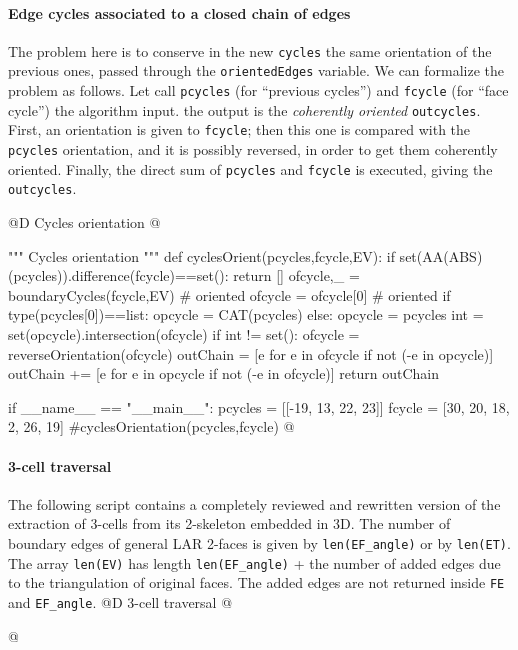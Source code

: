 \documentclass[11pt,oneside]{article}    %
\begin{document}
\paragraph{Edge cycles associated to a closed chain of edges}

The problem here is to conserve in the new \texttt{cycles} the same orientation of the previous ones,
passed through the \texttt{orientedEdges} variable. We can formalize the problem as follows. Let call \texttt{pcycles} (for ``previous cycles'') and \texttt{fcycle} (for ``face cycle'') the algorithm input. the output is the \emph{coherently oriented} \texttt{outcycles}. First, an orientation is given to \texttt{fcycle}; then this one is compared with the \texttt{pcycles} orientation, and it is possibly reversed, in order to get them coherently oriented. Finally, the direct sum of \texttt{pcycles} and \texttt{fcycle} is executed, giving the \texttt{outcycles}.

@D Cycles orientation
@{""" Cycles orientation """
def cyclesOrient(pcycles,fcycle,EV):
    if set(AA(ABS)(pcycles)).difference(fcycle)==set(): return []
    ofcycle,_ = boundaryCycles(fcycle,EV) # oriented 
    ofcycle = ofcycle[0] # oriented 
    if type(pcycles[0])==list: opcycle = CAT(pcycles)
    else: opcycle = pcycles
    int = set(opcycle).intersection(ofcycle)
    if int != set(): 
        ofcycle = reverseOrientation(ofcycle)
    outChain = [e for e in ofcycle if not (-e in opcycle)] 
    outChain += [e for e in opcycle if not (-e in ofcycle)] 
    return outChain

if __name__ == "__main__":
    pcycles = [[-19, 13, 22, 23]]
    fcycle = [30, 20, 18, 2, 26, 19]
    #cyclesOrientation(pcycles,fcycle)
@}

\paragraph{3-cell traversal}
The following script contains a completely reviewed and rewritten version of the extraction of 3-cells from its 2-skeleton embedded in 3D. The number of boundary edges of general LAR 2-faces is given by \texttt{len(EF\_angle)} or by \texttt{len(ET)}. The array \texttt{len(EV)} has length \texttt{len(EF\_angle)} + the number of added edges due to the triangulation of original faces. The added edges are not returned inside \texttt{FE} and \texttt{EF\_angle}.
@D 3-cell traversal
@{

@}
\end{document}
